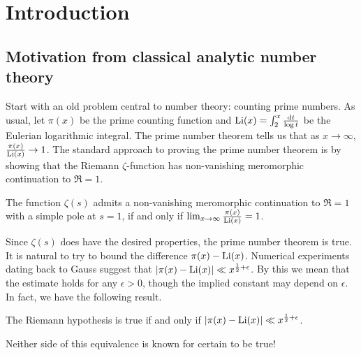 
\chapter{Introduction}





\section{Motivation from classical analytic number theory}

Start with an old problem central to number theory: counting 
prime numbers. As usual, let $\pi(x)$ be the prime counting function and 
$\operatorname{Li}(x) = \int_2^x \frac{\mathrm{d} t}{\log t}$ be the Eulerian logarithmic integral. 
The prime number theorem tells us that as $x\to \infty$, 
$\frac{\pi(x)}{\operatorname{Li}(x)} \to 1$. The standard approach 
to proving the prime number theorem is by showing that the Riemann 
$\zeta$-function has non-vanishing meromorphic continuation to $\Re = 1$.

\begin{theorem}
The function $\zeta(s)$ admits a non-vanishing meromorphic continuation to 
$\Re = 1$ with a simple pole at $s=1$, if and only if 
$\lim_{x\to \infty} \frac{\pi(x)}{\operatorname{Li}(x)} = 1$. 
\end{theorem}

Since $\zeta(s)$ does have the desired properties, the prime number 
theorem is true. It is natural to try to bound the difference 
$\pi(x) - \operatorname{Li}(x)$. Numerical experiments dating back to Gauss suggest that 
$|\pi(x) - \operatorname{Li}(x)| \ll x^{\frac 1 2+\epsilon}$. By this we mean that the 
estimate holds for any $\epsilon>0$, though the implied constant may depend on 
$\epsilon$. In fact, we have the following result. 

\begin{theorem}
The Riemann hypothesis is true if and only if 
$|\pi(x) - \operatorname{Li}(x)| \ll x^{\frac 1 2+\epsilon}$. 
\end{theorem}

Neither side of this equivalence is known for certain to be true! 

